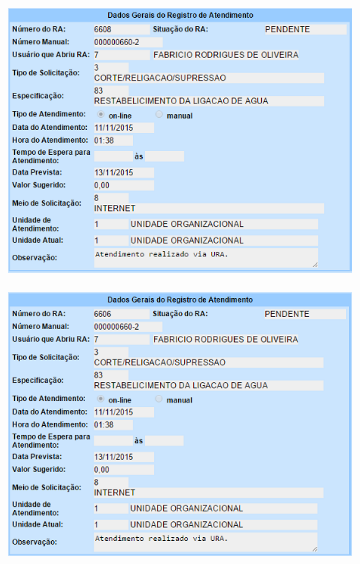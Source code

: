 \begin{apendicesenv}
\begin{figure}[H]
	\centering
	\caption*{Solicitar Restabelecimento da Ligação de Água - Cenário 2 Detalhado.}
	\begin{subfigure}[H]{\textwidth}
		\centering
		\includegraphics{figuras/anexo/restabelecer/detalhe_2.png}
	\end{subfigure}
\end{figure}

\begin{figure}[H]
	\centering
	\caption*{Solicitar Restabelecimento da Ligação de Água - Cenário 3 Detalhado.}
	\begin{subfigure}[H]{\textwidth}
		\centering
		\includegraphics{figuras/anexo/restabelecer/detalhe_3.png}
	\end{subfigure}
\end{figure}


\end{apendicesenv}



